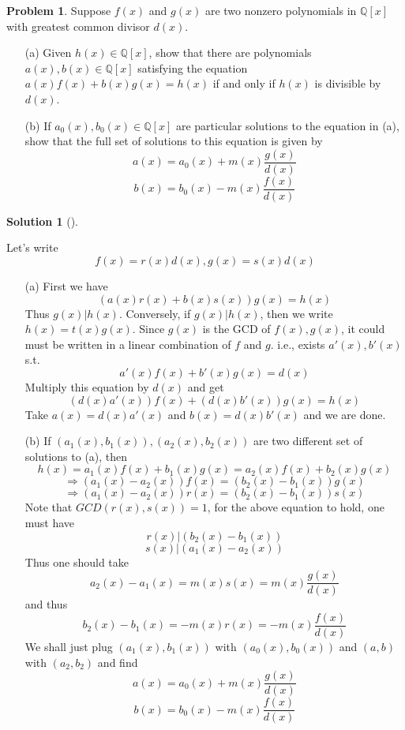 \documentclass{article}
\theoremstyle{definition}
\newtheorem{prob}{Problem}
\newtheorem*{sol}{Solution}
\newenvironment{sols}[1][]{%
  \begin{sol}[#1]$ $\par\nobreak\ignorespaces
}{%
  \end{sol}
}
\begin{document}
\setcounter{prob}{10}
\begin{prob}
  Suppose $f(x)$ and $g(x)$ are two nonzero polynomials in $\mathbb{Q}[x]$ with greatest common divisor $d(x)$. 

  \begin{enumerate}
    \item[(a)] Given $h(x) \in \mathbb{Q}[x]$, show that there are polynomials $a(x), b(x) \in \mathbb{Q}[x]$ satisfying the equation $a(x) f(x) + b(x) g(x) = h(x)$ if and only if $h(x)$ is divisible by $d(x)$. 
    \item[(b)] If $a_0(x), b_0(x) \in \mathbb{Q}[x]$ are particular solutions to the equation in (a), show that the full set of solutions to this equation is given by
      \[
        a(x) = a_0(x) + m(x) \frac{g(x)}{d(x)}
      \]
      \[
        b(x) = b_0(x) - m(x) \frac{f(x)}{d(x)}
      \]
  \end{enumerate}

\end{prob}

\begin{sols}
  Let's write
  \[
    f(x) = r(x) d(x), g(x) = s(x) d(x)
  \]
  \begin{enumerate}
    \item[(a)] First we have
      \[
        (a(x) r(x) + b(x) s(x)) g(x) = h(x)
      \]
      Thus $g(x) | h(x)$. Conversely, if $g(x) | h(x)$, then we write $h(x) = t(x) g(x)$. Since $g(x)$ is the GCD of $f(x), g(x)$, it could must be written in a linear combination of $f$ and $g$. i.e., exists $a'(x), b'(x)$ s.t.
      \[
        a'(x) f(x) + b'(x) g(x) = d(x)
      \]
      Multiply this equation by $d(x)$ and get
      \[
        (d(x) a'(x)) f(x) + (d(x) b'(x)) g(x) = h(x)
      \]
      Take $a(x) = d(x) a'(x)$ and $b(x) = d(x) b'(x)$ and we are done. 
    \item[(b)] If $(a_1(x), b_1(x)), (a_2(x), b_2(x))$ are two different set of solutions to (a), then 
      \[
        h(x) = a_1(x) f(x) + b_1(x) g(x) = a_2(x) f(x) + b_2(x) g(x)
      \]
      \[
        \Rightarrow (a_1(x) - a_2(x)) f(x) = (b_2(x) - b_1(x)) g(x)
      \]
      \[
        \Rightarrow (a_1(x) - a_2(x)) r(x) = (b_2(x) - b_1(x)) s(x)
      \]
      Note that $GCD(r(x), s(x)) = 1$, for the above equation to hold, one must have 
      \[
        r(x) | (b_2(x) - b_1(x))
      \]
      \[
        s(x) | (a_1(x) - a_2(x))
      \]
      Thus one should take 
      \[
        a_2(x) - a_1(x) = m(x) s(x) = m(x) \frac{g(x)}{d(x)}
      \]
      and thus
      \[
        b_2(x) - b_1(x) = -m(x) r(x) = -m(x) \frac{f(x)}{d(x)}
      \]
      We shall just plug $(a_1(x), b_1(x))$ with $(a_0(x), b_0(x))$ and $(a, b)$ with $(a_2, b_2)$ and find
      \[
        a(x) = a_0(x) + m(x) \frac{g(x)}{d(x)}
      \]
      \[
        b(x) = b_0(x) - m(x) \frac{f(x)}{d(x)}
      \]
  \end{enumerate}
\end{sols}
\end{document}

